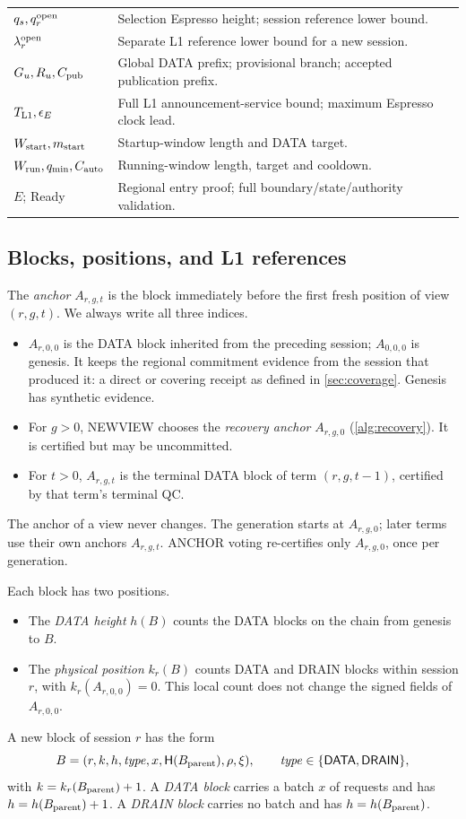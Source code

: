 \documentclass[11pt,a4paper]{article}
\newcommand{\Hash}{\mathsf H}
\newcommand{\tagg}[1]{\ensuremath{\mathsf{#1}}}
\newcommand{\defterm}[1]{\textcolor{rrBlue}{\textit{#1}}}
\begin{document}
\begin{table}[htbp]
\begin{tabularx}{\linewidth}{@{}p{.32\linewidth}Y@{}}
$q_s,q_r^{\rm open}$ & Selection Espresso height; session reference lower bound.\\
$\lambda_r^{\rm open}$ & Separate L1 reference lower bound for a new session.\\
$G_u,R_u,C_{\rm pub}$ & Global DATA prefix; provisional branch; accepted publication prefix.\\
$T_{\rm L1},\epsilon_E$ & Full L1 announcement-service bound; maximum Espresso clock lead.\\
$W_{\rm start},m_{\rm start}$ & Startup-window length and DATA target.\\
$W_{\rm run},q_{\min},C_{\rm auto}$ & Running-window length, target and cooldown.\\
$E$; Ready & Regional entry proof; full boundary/state/authority validation.\\
\bottomrule\end{tabularx}
\end{table}

\subsection{Blocks, positions, and L1 references}
\label{sec:blocks}
The \defterm{anchor} $A_{r,g,t}$ is the block immediately before the first fresh
position of view $(r,g,t)$. We always write all three indices.
\begin{itemize}
\item $A_{r,0,0}$ is the DATA block inherited from the preceding
session; $A_{0,0,0}$ is genesis. It keeps the regional commitment evidence from the session that
produced it: a direct or covering receipt as defined in
\cref{sec:coverage}. Genesis has synthetic evidence.
\item For $g>0$, NEWVIEW chooses the \defterm{recovery anchor} $A_{r,g,0}$
(\cref{alg:recovery}). It is certified but may be uncommitted.
\item For $t>0$, $A_{r,g,t}$ is the terminal DATA block of term
$(r,g,t-1)$, certified by that term's terminal QC.
\end{itemize}
The anchor of a view never changes. The generation starts at
$A_{r,g,0}$; later terms use their own anchors $A_{r,g,t}$. ANCHOR voting
re-certifies only $A_{r,g,0}$, once per generation.

Each block has two positions.
\begin{itemize}
\item The \defterm{DATA height} $h(B)$ counts the DATA blocks on the chain
from genesis to $B$.
\item The \defterm{physical position} $k_r(B)$ counts DATA and DRAIN blocks
within session $r$, with $k_r(A_{r,0,0})=0$. This local count does not change
the signed fields of $A_{r,0,0}$.
\end{itemize}
A new block of session $r$ has the form
\[
 B=(r,k,h,\mathit{type},x,\Hash(B_{\rm parent}),\rho,\xi),
 \qquad \mathit{type}\in\{\tagg{DATA},\tagg{DRAIN}\},
\]
with $k=k_r(B_{\rm parent})+1$. A \defterm{DATA block} carries a batch $x$ of
requests and has $h=h(B_{\rm parent})+1$. A \defterm{DRAIN block} carries no batch
and has $h=h(B_{\rm parent})$.
\end{document}
